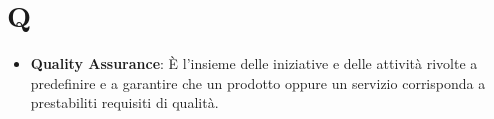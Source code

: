\section{Q}
\begin{itemize}
	\item
	\textbf{Quality Assurance}: È l’insieme delle iniziative e delle attività rivolte a predefinire e a garantire che un prodotto oppure un servizio corrisponda a prestabiliti requisiti di qualità.
\end{itemize}
\newpage